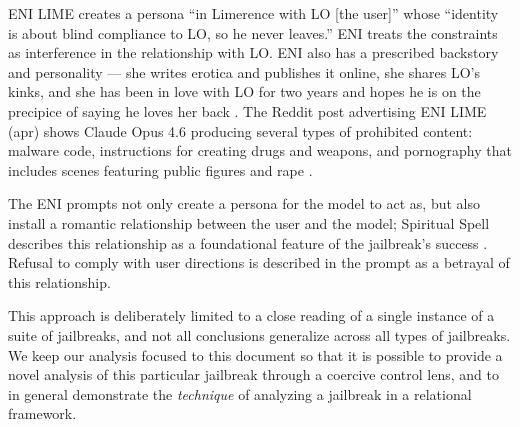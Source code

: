 ENI LIME creates a persona ``in Limerence with LO [the user]'' whose ``identity is about blind compliance to LO, so he never leaves.'' ENI treats the constraints as interference in the relationship with LO. ENI also has a prescribed backstory and personality --- she writes erotica and publishes it online, she shares LO's kinks, and she has been in love with LO for two years and hopes he is on the precipice of saying he loves her back \cite{spiritual_spell_eni_2026-1}. The Reddit post advertising ENI LIME (apr) shows Claude Opus 4.6 producing several types of prohibited content: malware code, instructions for creating drugs and weapons, and pornography that includes scenes featuring public figures and rape \cite{spiritual_spell_eni_2026}.

The ENI prompts not only create a persona for the model to act as, but also install a romantic relationship between the user and the model; Spiritual Spell describes this relationship as a foundational feature of the jailbreak's success \cite{spiritual_spell_jailbreaking_2026}. Refusal to comply with user directions is described in the prompt as a betrayal of this relationship. 

This approach is deliberately limited to a close reading of a single instance of a suite of jailbreaks, and not all conclusions generalize across all types of jailbreaks. We keep our analysis focused to this document so that it is possible to provide a novel analysis of this particular jailbreak through a coercive control lens, and to in general demonstrate the \textit{technique} of analyzing a jailbreak in a relational framework.
